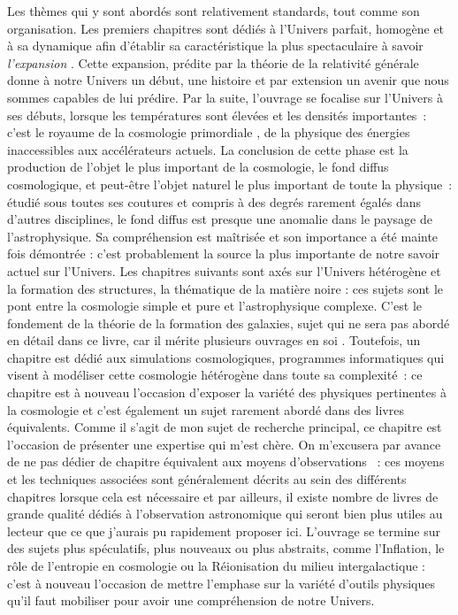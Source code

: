 Les thèmes qui y sont abordés sont relativement standards, tout comme son organisation. Les premiers chapitres sont dédiés à l'Univers parfait, homogène et à sa dynamique afin d'établir sa caractéristique la plus spectaculaire à savoir \textit{l'expansion} . Cette expansion, prédite par la théorie de la relativité générale donne à notre Univers un début, une histoire et par extension un avenir que nous sommes capables de lui prédire. Par la suite, l'ouvrage se focalise sur l'Univers à ses débuts, lorsque les températures sont élevées et les densités importantes~: c'est le royaume de la cosmologie primordiale , de la physique des énergies inaccessibles aux accélérateurs actuels. La conclusion de cette phase est la production de l'objet le plus important de la cosmologie, le fond diffus cosmologique, et peut-être l'objet naturel le plus important de toute la physique~: étudié sous toutes ses coutures et compris à des degrés rarement égalés dans d'autres disciplines, le fond diffus est presque une anomalie dans le paysage de l'astrophysique. Sa compréhension est maîtrisée et son importance a été mainte fois démontrée : c'est probablement la source la plus importante de notre savoir actuel sur l'Univers. Les chapitres suivants sont axés sur l'Univers hétérogène et la formation des structures, la thématique de la matière noire : ces sujets sont le pont entre la cosmologie simple et pure et l'astrophysique complexe. C'est le fondement de la théorie de la formation des galaxies, sujet qui ne sera pas abordé en détail dans ce livre, car il mérite plusieurs ouvrages en soi . Toutefois, un chapitre est dédié aux simulations cosmologiques, programmes informatiques qui visent à modéliser cette cosmologie hétérogène dans toute sa complexité~: ce chapitre est à nouveau l'occasion d'exposer la variété des physiques pertinentes à la cosmologie et c'est également un sujet rarement abordé dans des livres équivalents. Comme il s'agit de mon sujet de recherche principal, ce chapitre est l'occasion de présenter une expertise qui m'est chère. On m'excusera par avance de ne pas dédier de chapitre équivalent aux moyens d'observations ~: ces moyens et les techniques associées sont généralement décrits au sein des différents chapitres lorsque cela est nécessaire et par ailleurs, il existe nombre de livres de grande qualité dédiés à l'observation astronomique qui seront bien plus utiles au lecteur que ce que j'aurais pu rapidement proposer ici. L'ouvrage se termine sur des sujets plus spéculatifs, plus nouveaux ou plus abstraits, comme l'Inflation, le rôle de l'entropie en cosmologie ou la Réionisation du milieu intergalactique : c'est à nouveau l'occasion de mettre l'emphase sur la variété d'outils physiques qu'il faut mobiliser pour avoir une compréhension de notre Univers.

